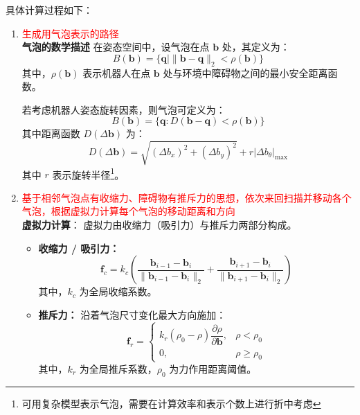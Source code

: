 \documentclass[../main.tex]{subfiles}
\begin{document}
\begin{enumerate}
\begin{itemize}
                {\small{}
                具体计算过程如下：
                \begin{enumerate}
    
    \item \textcolor{red}{生成用气泡表示的路径}\\\textbf{气泡的数学描述}
    在姿态空间中，设气泡在点 $\mathbf{b}$ 处，其定义为：
    \[
        B(\mathbf{b}) = \{ \mathbf{q} \mid \| \mathbf{b} - \mathbf{q} \|_2 < \rho(\mathbf{b}) \}
    \]
    其中，$\rho(\mathbf{b})$ 表示机器人在点 $\mathbf{b}$ 处与环境中障碍物之间的最小安全距离函数。  

    若考虑机器人姿态旋转因素，则气泡可定义为：
    \[
        B(\mathbf{b}) = \{ \mathbf{q} : D(\mathbf{b} - \mathbf{q}) < \rho(\mathbf{b}) \}
    \]
    其中距离函数 $D(\Delta \mathbf{b})$ 为：
    \[
        D(\Delta \mathbf{b}) = \sqrt{(\Delta b_x)^2 + (\Delta b_y)^2} + r \left| \Delta b_\theta \right|_{\max}
    \]
    其中 $r$ 表示旋转半径\footnote{可用复杂模型表示气泡，需要在计算效率和表示个数上进行折中考虑}。


    \item     \textcolor{red}{基于相邻气泡点有收缩力、障碍物有推斥力的思想，依次来回扫描并移动各个气泡，根据虚拟力计算每个气泡的移动距离和方向}\\\textbf{虚拟力计算}：
    \vspace{1em}
    虚拟力由收缩力（吸引力）与推斥力两部分构成。

    \begin{itemize}
        \item \textbf{收缩力 / 吸引力：}
        \[
            \mathbf{f}_c = k_c \left( 
            \frac{\mathbf{b}_{i-1} - \mathbf{b}_i}{\|\mathbf{b}_{i-1} - \mathbf{b}_i\|_2} + 
            \frac{\mathbf{b}_{i+1} - \mathbf{b}_i}{\|\mathbf{b}_{i+1} - \mathbf{b}_i\|_2} 
            \right)
        \]
        其中，$k_c$ 为全局收缩系数。

        \item \textbf{推斥力：} 沿着气泡尺寸变化最大方向施加：
        \[
            \mathbf{f}_r =
            \begin{cases}
                k_r (\rho_0 - \rho)\dfrac{\partial \rho}{\partial \mathbf{b}}, & \rho < \rho_0 \\
                0, & \rho \geq \rho_0
            \end{cases}
        \]
        其中，$k_r$ 为全局推斥系数，$\rho_0$ 为力作用距离阈值。


\end{itemize}
\end{enumerate}}
\end{itemize}
\end{enumerate}
\end{document}
